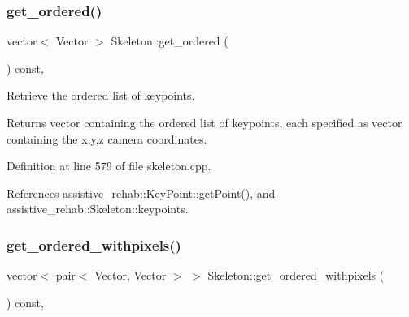 \subsubsection{\texorpdfstring{get\_ordered()}{get\_ordered()}}
{\footnotesize\ttfamily vector$<$ Vector $>$ Skeleton\+::get\+\_\+ordered (\begin{DoxyParamCaption}{ }\end{DoxyParamCaption}) const\hspace{0.3cm}{\ttfamily [virtual]}, {\ttfamily [inherited]}}



Retrieve the ordered list of keypoints. 

\begin{DoxyReturn}{Returns}
vector containing the ordered list of keypoints, each specified as vector containing the x,y,z camera coordinates. 
\end{DoxyReturn}


Definition at line 579 of file skeleton.\+cpp.


\begin{DoxyCode}{0}

\end{DoxyCode}


References assistive\+\_\+rehab\+::\+Key\+Point\+::get\+Point(), and assistive\+\_\+rehab\+::\+Skeleton\+::keypoints.

\mbox{\label{classassistive__rehab_1_1Skeleton_a270506cde494cb4261c7892edb46ce53}} 
\subsubsection{\texorpdfstring{get\_ordered\_withpixels()}{get\_ordered\_withpixels()}}
{\footnotesize\ttfamily vector$<$ pair$<$ Vector, Vector $>$ $>$ Skeleton\+::get\+\_\+ordered\+\_\+withpixels (\begin{DoxyParamCaption}{ }\end{DoxyParamCaption}) const\hspace{0.3cm}{\ttfamily [virtual]}, {\ttfamily [inherited]}}



